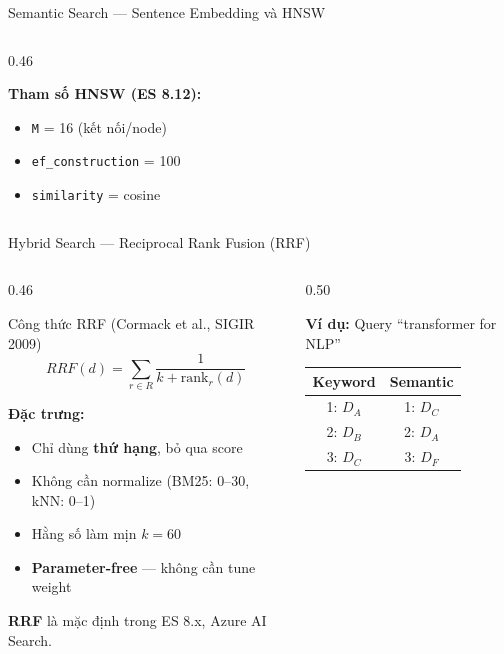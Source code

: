 \begin{frame}{Semantic Search --- Sentence Embedding và HNSW}
\begin{columns}[T]
\begin{column}{0.46\textwidth}
\vspace{0.05cm}

{\small
\textbf{Tham số HNSW (ES 8.12):}
\begin{itemize}\itemsep0pt \parskip0pt 
    \item \texttt{M} = 16 (kết nối/node)
    \item \texttt{ef\_construction} = 100
    \item \texttt{similarity} = cosine
\end{itemize}
}

\end{column}
\end{columns}
\end{frame}

\begin{frame}{Hybrid Search --- Reciprocal Rank Fusion (RRF)}
\begin{columns}[T]
\begin{column}{0.46\textwidth}

\begin{block}{Công thức RRF {\scriptsize (Cormack et al., SIGIR 2009)}}
\[
\boxed{RRF(d) = \sum_{r \in R} \frac{1}{k + \text{rank}_r(d)}}
\]
\end{block}

\vspace{0.05cm}
{\footnotesize
\textbf{Đặc trưng:}
\begin{itemize}\itemsep0pt \parskip0pt 
    \item Chỉ dùng \textbf{thứ hạng}, bỏ qua score
    \item Không cần normalize (BM25: 0--30, kNN: 0--1)
    \item Hằng số làm mịn $k = 60$
    \item \textbf{Parameter-free} --- không cần tune weight
\end{itemize}
}

\vspace{0.05cm}
{\scriptsize\textcolor{accentTeal}{\textbf{RRF} là mặc định trong ES 8.x, Azure AI Search.}}

\end{column}
\begin{column}{0.50\textwidth}

\textbf{Ví dụ:} Query ``transformer for NLP''

\vspace{0.1cm}

{\scriptsize
\begin{tabular}{c|c}
\textcolor{accentBlue}{\textbf{Keyword}} & \textcolor{accentOrange}{\textbf{Semantic}} \\
\hline
1: $D_A$ & 1: $D_C$ \\
2: $D_B$ & 2: $D_A$ \\
3: $D_C$ & 3: $D_F$ \\
\end{tabular}
}


\end{column}
\end{columns}
\end{frame}
